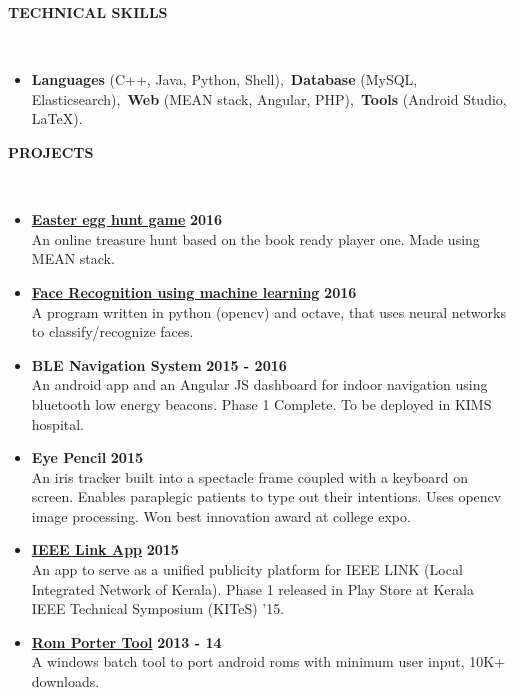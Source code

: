 \documentclass[a4paper,10pt]{article}
\newcommand{\lsep}{-0.5cm}
\newcommand{\resheading}[1]{{\small \colorbox{mygrey}{\begin{minipage}{0.975\textwidth}{\textbf{\uppercase{#1} \vphantom{p\^{E}}}}\end{minipage}}}}
\newcommand{\when}[1]{\hfill \textbf{#1}}
\newenvironment{noSepItemize}
{ \begin{itemize}
    \setlength{\itemsep}{1pt}
    \setlength{\parskip}{0pt}
    \setlength{\parsep}{0pt}     }
{ \end{itemize}                  }
\begin{document}
\resheading{\textbf{TECHNICAL SKILLS} }\\[\lsep]
\begin{noSepItemize}
\item \noindent \textbf{Languages} (C++, Java, Python, Shell),\, \textbf{Database} (MySQL, Elasticsearch),\, \textbf{Web} (MEAN stack, Angular, PHP),\, \textbf{Tools} (Android Studio, \LaTeX).
\end{noSepItemize}

\resheading{\textbf{PROJECTS} }\\[\lsep]
\begin{noSepItemize}
\item \textbf{\href{https://github.com/moonblade/gunt}{Easter egg hunt game}} \when{2016}\\
	An online treasure hunt based on the book ready player one. Made using MEAN stack.
\item \textbf{\href{https://github.com/moonblade/machineLearning/tree/master/faceRecognition}{Face Recognition using machine learning}} \when{2016}\\
	A program written in python (opencv) and octave, that uses neural networks to classify/recognize faces.
\item \textbf{BLE Navigation System} \when{2015 - 2016}\\
	An android app  and an Angular JS dashboard for indoor navigation using bluetooth low energy beacons. Phase 1 Complete. To be deployed in KIMS hospital.
\item \textbf{Eye Pencil} \when{2015}\\
	An iris tracker built into a spectacle frame coupled with a keyboard on screen. Enables paraplegic patients to type out their intentions. Uses opencv image processing. Won best innovation award at college expo.
\item \textbf{\href{https://play.google.com/store/apps/details?id=com.juggleclouds.ieeelink}{IEEE Link App}} \when{2015}\\
	An app to serve as a unified publicity platform for IEEE LINK (Local Integrated Network of Kerala). Phase 1 released in Play Store at Kerala IEEE Technical Symposium (KITeS) '15.
\item \textbf{\href{http://forum.xda-developers.com/showthread.php?t=2276871}{Rom Porter Tool}} \when{2013 - 14}\\
	A windows batch tool to port android roms with minimum user input, 10K+ downloads.
\end{noSepItemize}
\end{document}
